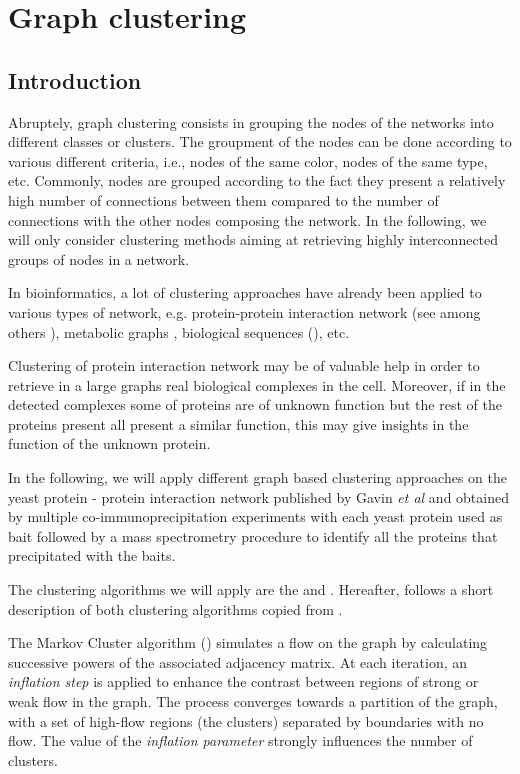 \chapter{Graph clustering}

\section{Introduction}

Abruptely, graph clustering consists in grouping the nodes of the networks into different
classes or clusters. The groupment of the nodes can be done according to various different criteria, i.e., nodes of 
the same color, nodes of the same type, etc. Commonly, nodes are grouped according to the fact they present a relatively high number of connections between them compared to the number of connections with the other nodes 
composing the network. In the following, we will only consider clustering methods aiming at retrieving highly interconnected groups of nodes in a network.

In bioinformatics, a lot of clustering approaches have already been applied to various types of network, e.g. protein-protein interaction network (see among others \cite{Spirin2003,King2004,Krogan2006}), metabolic graphs \cite{Gagneur2003}, biological sequences (\cite{Enright2002,Leplae2004}), etc. 

Clustering of protein interaction network may be of valuable help in order to retrieve in a large graphs real biological complexes in the cell. Moreover, if in the detected complexes some of proteins are of unknown function but the rest of the proteins present all present a similar function, this may give insights in the function of the unknown protein.

In the following, we will apply different graph based clustering approaches on the yeast protein - protein interaction network published by Gavin \textit{et al} \cite{Gavin2006} and obtained by multiple co-immunoprecipitation experiments with each yeast protein used as bait followed by a mass spectrometry procedure to identify all the proteins that precipitated with the baits.

The clustering algorithms we will apply are the  \cite{VanDongenPHD2000,Enright2002} and  \cite{King2004}. Hereafter, follows a short description of both clustering algorithms copied from \cite{Brohee2006}.
 
The Markov Cluster algorithm () simulates a flow on the graph by
calculating successive powers of the associated adjacency matrix. At
each iteration, an \textit{inflation step} is applied to enhance the
contrast between regions of strong or weak flow in the graph. The
process converges towards a partition of the graph, with a set of 
high-flow regions (the clusters) separated by boundaries with no 
flow. The value of the \textit{inflation parameter} strongly 
influences the number of clusters.

